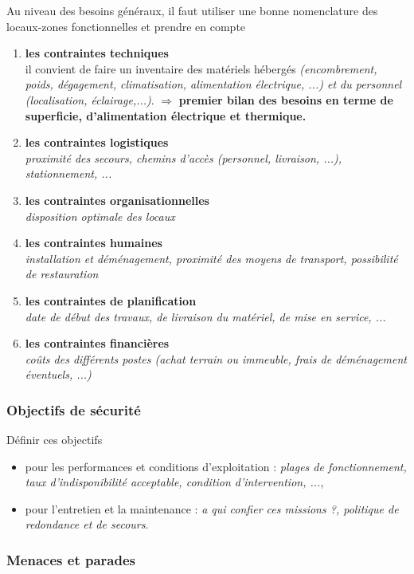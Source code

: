\documentclass[10pt,a4paper,oneside,titlepage]{report}
\newcommand{\titre}[1]{\textcolor{title}{#1}}
\newcommand{\strong}[1]{\textbf{\titre{#1}}}
\begin{document}
Au niveau des besoins généraux, il faut utiliser une bonne nomenclature des
locaux-zones fonctionnelles et prendre en compte
\begin{enumerate}
\item \strong{les contraintes techniques}\\
il convient de faire un inventaire des matériels hébergés
\textit{(encombrement, poids, dégagement, climatisation, alimentation
électrique, ...) et du personnel \textit{(localisation, éclairage,...)}}.
$\Rightarrow$ \strong{premier bilan des besoins en terme de superficie,
d'alimentation électrique et thermique.}
\item \strong{les contraintes logistiques}\\
\textit{proximité des secours, chemins d'accès (personnel, livraison, ...),
stationnement, ...}
\item \strong{les contraintes organisationnelles}\\
\textit{disposition optimale des locaux}
\item \strong{les contraintes humaines}\\
\textit{installation et déménagement, proximité des moyens de transport,
possibilité de restauration}
\item \strong{les contraintes de planification}\\
\textit{date de début des travaux, de livraison du matériel, de mise en service,
...}
\item \strong{les contraintes financières}\\
\textit{coûts des différents postes (achat terrain ou immeuble, frais de
déménagement éventuels, ...)}
\end{enumerate}

\subsubsection{Objectifs de sécurité}

Définir ces objectifs
\begin{itemize}
\item pour les performances et conditions d'exploitation : \textit{plages de
fonctionnement, taux d'indisponibilité acceptable, condition d'intervention,
...},
\item pour l'entretien et la maintenance : \textit{a qui confier ces missions ?,
politique de redondance et de secours}.
\end{itemize}

\subsubsection{Menaces et parades}
\end{document}
